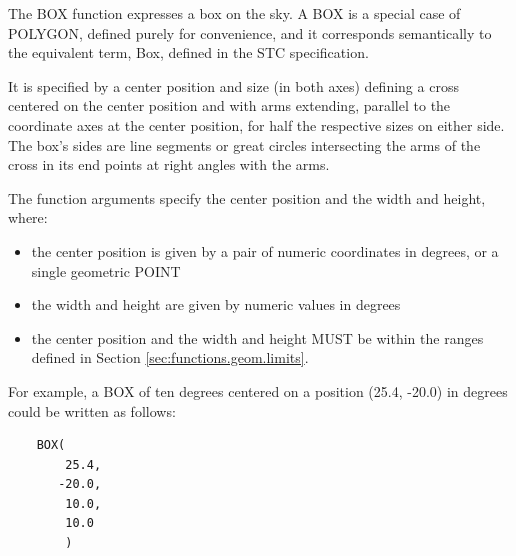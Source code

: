 \documentclass[11pt,a4paper]{ivoa}
\newcommand{\STCspec}{STC specification\xspace}
\newcommand{\SectionRef}[1]{Section \ref{#1}\xspace}
\begin{document}
The BOX function expresses a box on the sky. A BOX is a special case of POLYGON,
defined purely for convenience,
and it corresponds semantically to the equivalent term, Box, defined in
the \STCspec.

It is specified by a center position and size
(in both axes) defining a cross centered on the center position and
with arms extending, parallel to the coordinate axes at the center position,
for half the respective sizes on either side. The box’s sides are line
segments or great circles intersecting the arms of the cross in its end
points at right angles with the arms.



The function arguments specify the center position and the width and height,
where:
\begin{itemize}
    \item the center position is given by a pair of numeric coordinates
    in degrees, or a single geometric POINT
    \item the width and height are given by numeric values in degrees
    \item the center position and the width and height MUST be within the ranges defined in
    \SectionRef{sec:functions.geom.limits}.
\end{itemize}

For example, a BOX of ten degrees centered on a position
(25.4, -20.0) in degrees could be written as follows:
\begin{verbatim}
    BOX(
        25.4,
       -20.0,
        10.0,
        10.0
        )
\end{verbatim}
\end{document}
